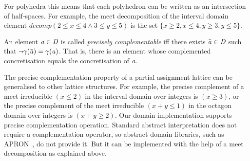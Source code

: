 \noindent For polyhedra this means that each polyhedron can be
written as an intersection of half-spaces.
%
For example, the meet decomposition of the interval domain element
$decomp(2\leq x\leq 4 \wedge 3\leq y\leq 5)$ is
the set $\{x\geq 2, x\leq 4, y\geq 3, y\leq 5\}$.
%
\begin{definition} 
An element $\mathit{a}\in \mathit{D}$ is called \emph{precisely complementable}
iff there exists $\bar{\mathit{a}} \in \mathit{D}$ such that 
$\neg\gamma(\bar{\mathit{a}})=\gamma(\mathit{a})$.
That is, there is an element whose complemented concretisation equals
the concretisation of $\mathit{a}$.
\end{definition}
%
The precise complementation property of a partial assignment lattice can
be generalised to other lattice structures. 
%
For example, the precise complement of a meet irreducible $(x \leq 2)$ in
the interval domain over integers is $(x \geq 3)$, or the precise complement
of the meet irreducible $(x+y \leq 1)$ in the octagon domain over integers
is $(x + y \geq 2)$.  Our domain implementation supports precise
complementation operation.  Standard abstract interpretation does
not require a complementation operator, so abstract domain libraries,
such as APRON~\cite{apron}, do not provide it.  But it can be implemented
with the help of a meet decomposition as explained above.
%
